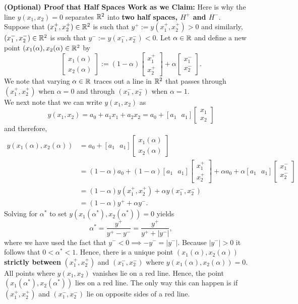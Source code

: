 \vspace*{.2cm}

\textbf{(Optional) Proof that Half Spaces Work as we Claim:} Here is why the line $y(x_1,x_2)=0$ separates $\mathbb R^2$ into \textbf{two half spaces, $H^+$ and $H^-$}.\\

Suppose that $(x^+_1,x^+_2) \in \mathbb R^2$ is such that $y^+:=y(x^+_1,x^+_2) >0$ and similarly, $(x^-_1,x^-_2) \in \mathbb R^2$ is such that $y^-:=y(x^-_1,x^-_2) < 0$. Let $\alpha \in \mathbb R$ and define a new point $(x_1(\alpha), x_2(\alpha) \in \mathbb R^2$ by
$$ \begin{bmatrix}x_1(\alpha)\\ x_2(\alpha)  \end{bmatrix}:= (1-\alpha) \begin{bmatrix}x^+_1 \\x^+_2  \end{bmatrix} +  \alpha \begin{bmatrix}x^-_1 \\ x^-_2 \end{bmatrix}. $$
We note that varying $\alpha \in \mathbb R$ traces out a line in $\mathbb R^2$ that passes through $(x^+_1,x^+_2)$ when $\alpha=0$ and through $(x^-_1,x^-_2)$ when $\alpha=1$.\\

We next note that we can write $y(x_1,x_2)$ as
$$y(x_1,x_2) = a_0 + a_1 x_1 + a_2 x_2 = a_0 +\left[ a_1~~~a_1  \right]  \begin{bmatrix}x_1\\ x_2 \end{bmatrix} $$
and therefore,
\begin{align*}
y(x_1(\alpha),x_2(\alpha)) &= a_0 +\left[ a_1~~~a_1  \right]  \begin{bmatrix}x_1(\alpha)\\ x_2(\alpha)  \end{bmatrix} \\
&= (1-\alpha) a_0 + (1-\alpha) \left[ a_1~~~a_1  \right] \begin{bmatrix}x^+_1 \\x^+_2  \end{bmatrix} +  \alpha a_0 + \alpha \left[ a_1~~~a_1  \right]  \begin{bmatrix}x^-_1 \\ x^-_2 \end{bmatrix}\\
&= (1-\alpha)y(x^+_1,x^+_2) + \alpha y(x^-_1,x^-_2) \\
&= (1-\alpha)y^+ + \alpha y^-. 
\end{align*}
Solving for $\alpha^*$ to set $y(x_1(\alpha^*),x_2(\alpha^*))=0$ yields
$$\alpha^* = \frac{y^+}{y^+ - y^-} =  \frac{y^+}{y^+ + |y^-|}, $$
where we have used the fact that $y^-<0 \implies -y^- = |y^-|.$ Because $|y^-|>0$ it follows that $0 < \alpha^* < 1$. Hence, there is a unique point $(x_1(\alpha),x_2(\alpha))$ \textbf{strictly between} $(x^+_1,x^+_2)$ and $(x^-_1,x^-_2)$ where $y(x_1(\alpha),x_2(\alpha))=0$. All points where $y(x_1,x_2)$ vanishes lie on a red line. Hence, the point $(x_1(\alpha^*),x_2(\alpha^*))$ lies on a red line. The only way this can happen is if $(x^+_1,x^+_2)$ and $(x^-_1,x^-_2)$ lie on opposite sides of a red line. \Qed

